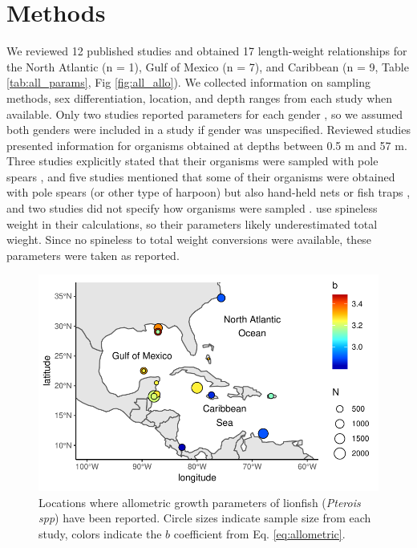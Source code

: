 \documentclass[fleqn,10pt,lineno]{wlpeerj} %
\begin{document}
\clearpage

\section*{Methods}

We reviewed 12 published studies and obtained 17 length-weight
relationships for the North Atlantic (n = 1), Gulf of Mexico (n = 7),
and Caribbean (n = 9, Table \ref{tab:all_params}, Fig
\ref{fig:all_allo}). We collected information on sampling methods, sex
differentiation, location, and depth ranges from each study when
available. Only two studies reported parameters for each gender
\citep{aguilarperera_2016,fogg_2013}, so we assumed both genders were
included in a study if gender was unspecified. Reviewed studies
presented information for organisms obtained at depths between 0.5 m and
57 m. Three studies explicitly stated that their organisms were sampled
with pole spears
\citep{dahl_2014,aguilarperera_2016,chin_2016,sabidoitz_2016}, and five
studies mentioned that some of their organisms were obtained with pole
spears (or other type of harpoon) but also hand-held nets or fish traps
\citep{barbour_2011,fogg_2013,edwards_2014,toledohernndez_2014,sandel_2015,sabidoitza_2016,sabidoitz_2016},
and two studies did not specify how organisms were sampled
\citep{darling_2011,deleon_2013}. \citet{fogg_2013} use spineless weight
in their calculations, so their parameters likely underestimated total
wieght. Since no spineless to total weight conversions were available,
these parameters were taken as reported.

\begin{figure}
\centering
\includegraphics{Manuscript_files/figure-latex/unnamed-chunk-2-1.pdf}
\caption{\label{fig:map}Locations where allometric growth parameters of
lionfish (\emph{Pterois spp}) have been reported. Circle sizes indicate
sample size from each study, colors indicate the \(b\) coefficient from
Eq. \ref{eq:allometric}.}
\end{figure}
\end{document}
